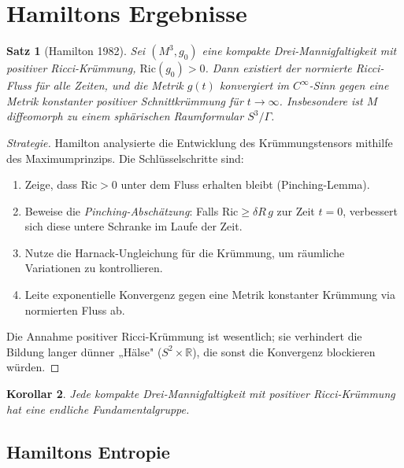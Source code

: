 \documentclass[12pt,a4paper]{amsart}
\newtheorem{theorem}{Satz}[section]
\newtheorem{korollar}[theorem]{Korollar}
\theoremstyle{definition}
\theoremstyle{remark}
\newcommand{\R}{\mathbb{R}}
\newcommand{\Ric}{\mathrm{Ric}}
\begin{document}
\section{Hamiltons Ergebnisse}
\label{sec:hamilton}

\begin{theorem}[Hamilton 1982]
\label{thm:hamilton82}
Sei $(M^3, g_0)$ eine kompakte Drei-Mannigfaltigkeit mit positiver
Ricci-Krümmung, $\Ric(g_0) > 0$.  Dann existiert der normierte Ricci-Fluss
für alle Zeiten, und die Metrik $g(t)$ konvergiert im $C^\infty$-Sinn gegen
eine Metrik konstanter positiver Schnittkrümmung für $t\to\infty$.
Insbesondere ist $M$ diffeomorph zu einem sphärischen Raumformular
$S^3/\Gamma$.
\end{theorem}

\begin{proof}[Strategie]
Hamilton analysierte die Entwicklung des Krümmungstensors mithilfe des
Maximumprinzips.  Die Schlüsselschritte sind:
\begin{enumerate}[label=(\roman*)]
  \item Zeige, dass $\Ric > 0$ unter dem Fluss erhalten bleibt
    (Pinching-Lemma).
  \item Beweise die \emph{Pinching-Abschätzung}: Falls $\Ric \geq \delta R\,g$
    zur Zeit $t = 0$, verbessert sich diese untere Schranke im Laufe der Zeit.
  \item Nutze die Harnack-Ungleichung für die Krümmung, um räumliche
    Variationen zu kontrollieren.
  \item Leite exponentielle Konvergenz gegen eine Metrik konstanter
    Krümmung via normierten Fluss ab.
\end{enumerate}
Die Annahme positiver Ricci-Krümmung ist wesentlich; sie verhindert die
Bildung langer dünner „Hälse" ($S^2 \times \R$), die sonst die Konvergenz
blockieren würden.
\end{proof}

\begin{korollar}
Jede kompakte Drei-Mannigfaltigkeit mit positiver Ricci-Krümmung hat eine
endliche Fundamentalgruppe.
\end{korollar}

\subsection{Hamiltons Entropie}
\end{document}
